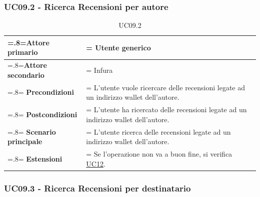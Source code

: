         \subsubsection{UC09.2 - Ricerca Recensioni per autore}
        \label{UC09.2}

            \begin{table}[H]
                \centering
                \renewcommand{\arraystretch}{1.8}
                \renewcommand\tabularxcolumn[1]{m{#1}}
                \begin{tabularx}{0.9\textwidth} {
                    >{\hsize=.8\hsize\linewidth=\hsize}X
                    >{\hsize=1.2\hsize\linewidth=\hsize}X}
                    \hline
                    \textbf{Attore primario} & Utente generico \\
                    \hline
                    \textbf{Attore secondario} & Infura \\
                    \hline
                    \textbf{Precondizioni} & L'utente vuole ricercare delle recensioni legate ad un indirizzo wallet dell'autore. \\
                    \hline
                    \textbf{Postcondizioni} & L'utente ha ricercato delle recensioni legate ad un indirizzo wallet dell'autore. \\
                    \hline
                    \textbf{Scenario principale} & L'utente ricerca delle recensioni legate ad un indirizzo wallet dell'autore.\\
                    \hline
                    \textbf{Estensioni} & Se l'operazione non va a buon fine, si verifica \hyperref[UC12]{UC12}. \\
                    \hline
                \end{tabularx}
                \caption{UC09.2}
            \end{table}

        \subsubsection{UC09.3 - Ricerca Recensioni per destinatario}
        \label{UC09.3}

